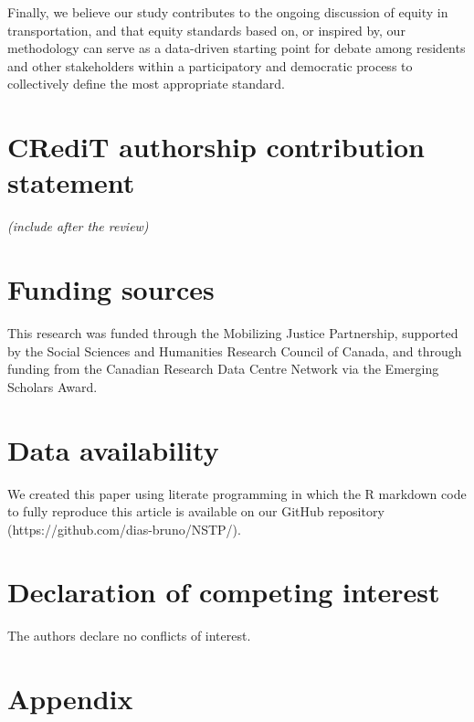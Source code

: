 \documentclass[preprint, 3p,
authoryear]{elsarticle} %
\begin{document}
Finally, we believe our study contributes to the ongoing discussion of
equity in transportation, and that equity standards based on, or
inspired by, our methodology can serve as a data-driven starting point
for debate among residents and other stakeholders within a participatory
and democratic process to collectively define the most appropriate
standard.

\section*{CRediT authorship contribution
statement}\label{credit-authorship-contribution-statement}

\emph{(include after the review)}

\section*{Funding sources}\label{funding-sources}

This research was funded through the Mobilizing Justice Partnership,
supported by the Social Sciences and Humanities Research Council of
Canada, and through funding from the Canadian Research Data Centre
Network via the Emerging Scholars Award.

\section*{Data availability}\label{data-availability}

We created this paper using literate programming in which the R markdown
code to fully reproduce this article is available on our GitHub
repository (https://github.com/dias-bruno/NSTP/).

\section*{Declaration of competing
interest}\label{declaration-of-competing-interest}

The authors declare no conflicts of interest.

\section*{Appendix}\label{appendix}
\end{document}
